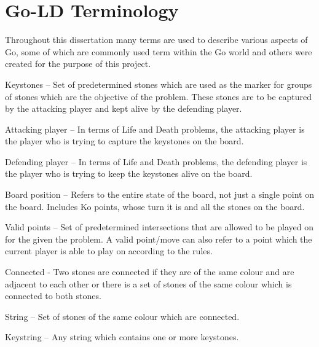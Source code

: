 \documentclass{l4proj}
\begin{document}
\section{Go-LD Terminology}

Throughout this dissertation many terms are used to describe various aspects of Go, some of which are commonly used term within the Go world and others were created for the purpose of this project.

Keystones – Set of predetermined stones which are used as the marker for groups of stones which are the objective of the problem. These stones are to be captured by the attacking player and kept alive by the defending player.

Attacking player – In terms of Life and Death problems, the attacking player is the player who is trying to capture the keystones on the board.

Defending player – In terms of Life and Death problems, the defending player is the player who is trying to keep the keystones alive on the board.

Board position – Refers to the entire state of the board, not just a single point on the board. Includes Ko points, whose turn it is and all the stones on the board.

Valid points – Set of predetermined intersections that are allowed to be played on for the given the problem. A valid point/move can also refer to a point which the current player is able to play on according to the rules.

Connected - Two stones are connected if they are of the same colour and are adjacent to each other or there is a set of stones of the same colour which is connected to both stones.

String – Set of stones of the same colour which are connected.

Keystring – Any string which contains one or more keystones.
\end{document}
